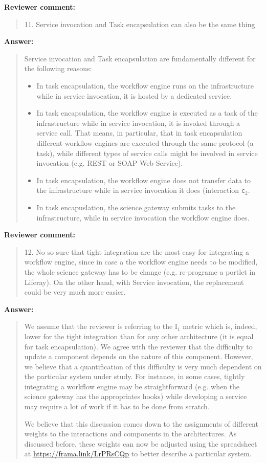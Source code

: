 \documentclass[a4]{article}
\newenvironment{review}%
{\textbf{Reviewer comment:}\begin{quote}}%
{\end{quote}}%
\newenvironment{answer}%
{\textbf{Answer:}\begin{small}\begin{quote}}%
{\end{quote}\end{small}}%
\begin{document}
\begin{review}
  11. Service invocation and Task encapsulation can also be the same
  thing
\end{review}

\begin{answer}
  Service invocation and Task encapsulation are fundamentally different for the following reasons:
  \begin{itemize}
  \item In task encapsulation, the workflow engine runs on the infrastructure while in service invocation, it is hosted by a dedicated service.
  \item In task encapsulation, the workflow engine is executed as a task of the infrastructure while in service invocation, it is invoked through a service call. That means, in particular, that in task encapsulation different workflow engines are executed through the same protocol (a task), while different types of service calls might be involved in service invocation (e.g. REST or SOAP Web-Service).
  \item In task encapsulation, the workflow engine does not transfer data to the infrastructure while in service invocation it does (interaction \texttt{c$_2$}.
  \item In task encapuslation, the science gateway submits tasks to the infrastructure, while in service invocation the workflow engine does.
  \end{itemize}
\end{answer}

\begin{review}
12. No so sure that tight integration are the most easy for
integrating a workflow engine, since in case a the workflow engine
needs to be modified, the whole science gateway has to be change
(e.g. re-programe a portlet in Liferay). On the other hand, with
Service invocation, the replacement could be very much more easier.
\end{review}

\begin{answer}
  We assume that the reviewer is referring to the I$_1$ metric which
  is, indeed, lower for the tight integration than for any other
  architecture (it is equal for task encapsulation). We agree with the
  reviewer that the difficulty to update a component depends on the
  nature of this component. However, we believe that a quantification
  of this difficulty is very much dependent on the particular system
  under study. For instance, in some cases, tightly integrating a
  workflow engine may be straightforward (e.g. when the science
  gateway has the appropriates hooks) while developing a service may
  require a lot of work if it has to be done from scratch.

  We believe that this discussion comes down to the assignments of
  different weights to the interactions and components in the
  architectures. As discussed before, these weights can now be
  adjusted using the spreadsheet at \url{https://frama.link/LrPRsCQp}
  to better describe a particular system.
\end{answer}
\end{document}
